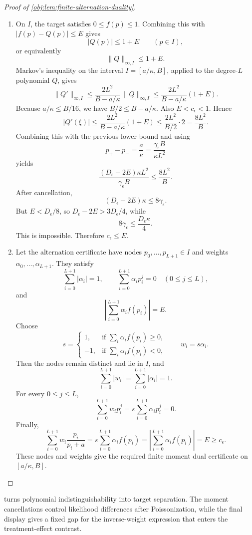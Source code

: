 \documentclass[11pt]{article}
\begin{document}
\begin{proof}[Proof of \cref{obj:lem:finite-alternation-duality}]
\begin{enumerate}
\item On \(I\), the target satisfies \(0\le f(p)\le1\). Combining this with \(|f(p)-Q(p)|\le E\) gives
\[
|Q(p)|\le 1+E\qquad (p\in I),
\]
or equivalently
\[
\|Q\|_{\infty,I}\le 1+E.
\]
Markov's inequality on the interval \(I=[a/\kappa,B]\), applied to the degree-\(L\) polynomial \(Q\), gives
\[
\|Q'\|_{\infty,I}
\le
\frac{2L^2}{B-a/\kappa}\,\|Q\|_{\infty,I}
\le
\frac{2L^2}{B-a/\kappa}(1+E).
\]
Because \(a/\kappa\le B/16\), we have \(B/2\le B-a/\kappa\). Also \(E<c_\epsilon<1\). Hence
\[
|Q'(\xi)|
\le
\frac{2L^2}{B-a/\kappa}(1+E)
\le
\frac{2L^2}{B/2}\cdot2
=
\frac{8L^2}{B}.
\]
Combining this with the previous lower bound and using
\[
p_+-p_-=\frac{a}{\kappa}
=\frac{\gamma_\epsilon B}{\kappa L^2}
\]
yields
\[
\frac{(D_\epsilon-2E)\kappa L^2}{\gamma_\epsilon B}
\le
\frac{8L^2}{B}.
\]
After cancellation,
\[
(D_\epsilon-2E)\kappa\le 8\gamma_\epsilon.
\]
But \(E<D_\epsilon/8\), so \(D_\epsilon-2E>3D_\epsilon/4\), while
\[
8\gamma_\epsilon\le \frac{D_\epsilon\kappa}{4}.
\]
This is impossible. Therefore \(c_\epsilon\le E\). %

\item Let the alternation certificate have nodes \(p_0,\ldots,p_{L+1}\in I\) and weights \(\alpha_0,\ldots,\alpha_{L+1}\). They satisfy
\[
\sum_{i=0}^{L+1}|\alpha_i|=1,
\qquad
\sum_{i=0}^{L+1}\alpha_i p_i^j=0\quad(0\le j\le L),
\]
and
\[
\left|\sum_{i=0}^{L+1}\alpha_i f(p_i)\right|=E.
\]
Choose
\[
s=
\begin{cases}
1,&\text{if }\sum_i\alpha_i f(p_i)\ge0,\\
-1,&\text{if }\sum_i\alpha_i f(p_i)<0,
\end{cases}
\qquad
w_i=s\alpha_i .
\]
Then the nodes remain distinct and lie in \(I\), and
\[
\sum_{i=0}^{L+1}|w_i|
=
\sum_{i=0}^{L+1}|\alpha_i|
=1.
\]
For every \(0\le j\le L\),
\[
\sum_{i=0}^{L+1}w_i p_i^j
=
s\sum_{i=0}^{L+1}\alpha_i p_i^j
=0.
\]
Finally,
\[
\sum_{i=0}^{L+1}w_i\frac{p_i}{p_i+a}
=
s\sum_{i=0}^{L+1}\alpha_i f(p_i)
=
\left|\sum_{i=0}^{L+1}\alpha_i f(p_i)\right|
=
E
\ge c_\epsilon.
\]
These nodes and weights give the required finite moment dual certificate on \([a/\kappa,B]\). %
\end{enumerate}
\end{proof}

 turns polynomial indistinguishability into target separation. The moment cancellations control likelihood differences after Poissonization, while the final display gives a fixed gap for the inverse-weight expression that enters the treatment-effect contrast.
\end{document}
